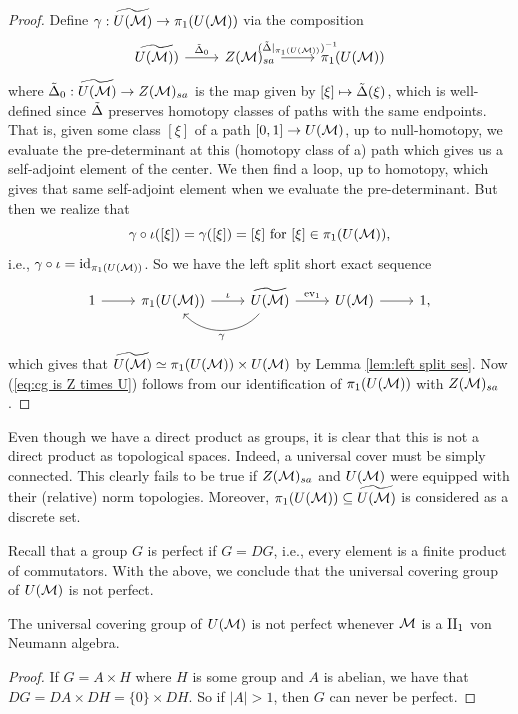 \documentclass{amsart}
\begin{document}
\begin{theorem}
\begin{proof}
Define $\gamma: \widetilde{U(\mathcal{M})} \to \pi_1(U(\mathcal{M}))$ via the composition
\begin{equation}
\begin{tikzcd}
\widetilde{U(\cM))} \arrow[r, "\tD_0"] & Z(\cM)_{sa} \arrow[r, "(\tD|_{\pi_1(U(\cM))})^{-1}"] & \pi_1(U(\cM))
\end{tikzcd}
\end{equation}
where $\tilde{\Delta}_0: \widetilde{U(\mathcal{M})} \to Z(\mathcal{M})_{sa}$ is the map given by $[\xi] \mapsto \tilde{\Delta}(\xi)$, which is well-defined since $\tilde{\Delta}$ preserves homotopy classes of paths with the same endpoints.
That is, given some class $[\xi]$ of a path $[0,1] \to U(\mathcal{M})$, up to null-homotopy, we evaluate the pre-determinant at this (homotopy class of a) path which gives us a self-adjoint element of the center. We then find a loop, up to homotopy, which gives that same self-adjoint element when we evaluate the pre-determinant. But then we realize that
\begin{equation}
\gamma \circ \iota([\xi]) = \gamma([\xi]) = [\xi] \text{ for } [\xi] \in \pi_1(U(\mathcal{M})),
\end{equation}
i.e., $\gamma \circ \iota = \text{id}_{\pi_1(U(\mathcal{M}))}$.
So we have the left split short exact sequence
\begin{equation}
\begin{tikzcd}
1 \arrow[r] & \pi_1(U(\cM)) \arrow[r, "\iota"] & \widetilde{U(\cM)} \arrow[r, "\ev_1"] \arrow[l, "\gamma", bend left=49] & U(\cM) \arrow[r] & 1,
\end{tikzcd}
\end{equation}
which gives that $\widetilde{U(\mathcal{M})} \simeq \pi_1(U(\mathcal{M})) \times U(\mathcal{M})$ by Lemma \ref{lem:left split ses}. Now (\ref{eq:cg is Z times U}) follows from our identification of $\pi_1(U(\mathcal{M}))$ with $Z(\mathcal{M})_{sa}$.
\end{proof}
\end{theorem}

\begin{remark}
Even though we have a direct product as groups, it is clear that this is not a direct product as topological spaces. Indeed, a universal cover must be simply connected. This clearly fails to be true if $Z(\mathcal{M})_{sa}$ and $U(\mathcal{M})$ were equipped with their (relative) norm topologies. 
Moreover, $\pi_1(U(\mathcal{M})) \subseteq \widetilde{U(\mathcal{M})}$ is considered as a discrete set.
\end{remark}

Recall that a group $G$ is perfect if $G = DG$, i.e., every element is a finite product of commutators.
With the above, we conclude that the universal covering group of $U(\mathcal{M})$ is not perfect. 


\begin{cor}
The universal covering group of $U(\mathcal{M})$ is not perfect whenever $\mathcal{M}$ is a $\text{II}_1$ von Neumann algebra.
\begin{proof}
If $G = A \times H$ where $H$ is some group and $A$ is abelian, we have that $DG = DA \times DH = \{0\} \times DH$. So if $|A| > 1$, then $G$ can never be perfect. 
\end{proof}
\end{cor}



  
  
\end{document}
